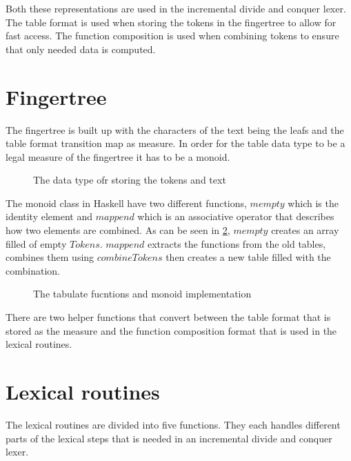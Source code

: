 Both these representations are used in the incremental divide and conquer lexer.
The table format is used when storing the tokens in the fingertree to allow for
fast access. The function composition is used when combining tokens to ensure
that only needed data is computed.

\section{Fingertree}
The fingertree is built up with the characters of the text being the leafs
and the table format transition map as measure. In order for the table data type
to be a legal measure of the fingertree it has to be a monoid.

\begin{figure}[h!]
  
  \caption{The data type ofr storing the tokens and text \label{fig:fingertreedt}}
\end{figure}

The monoid class in Haskell have two different functions, $mempty$ which is the
identity element and $mappend$ which is an associative operator that describes
how two elements are combined. As can be seen in \cref{fig:tablemonoid},
$mempty$ creates an array filled of empty $Tokens$. $mappend$ extracts the
functions from the old tables, combines them using $combineTokens$ then creates
a new table filled with the combination.

\begin{figure}[h!]
  
  \caption{The tabulate fucntions and monoid implementation \label{fig:tablemonoid}}
\end{figure}

There are two helper functions that convert between the table format that is
stored as the measure and the function composition format that is used in the
lexical routines.

\section{Lexical routines}
The lexical routines are divided into five functions. They each handles
different parts of the lexical steps that is needed in an incremental divide and
conquer lexer.

